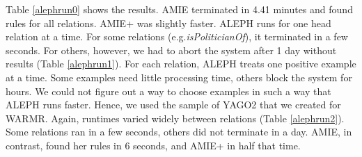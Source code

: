 Table \ref{alephrun0} shows the results. AMIE terminated in 4.41 minutes and found rules for all relations. AMIE+ was slightly faster.
ALEPH runs for one head relation at a time. For some relations (e.g.\emph{isPoliticianOf}),
it terminated in a few seconds.
For others, however, we had to abort the system after 1 day without results (Table \ref{alephrun1}).
For each relation, ALEPH treats one positive example at a time. Some examples need little processing time, others block the system for hours.
We could not figure out a way to choose examples in such a way that ALEPH runs faster.
Hence, we used the sample of YAGO2 that we created for WARMR.
Again, runtimes varied widely between relations (Table \ref{alephrun2}).
Some relations ran in a few seconds, others did not terminate in a day. AMIE, in contrast, found her rules in 6 seconds, and AMIE+ in half that time.

